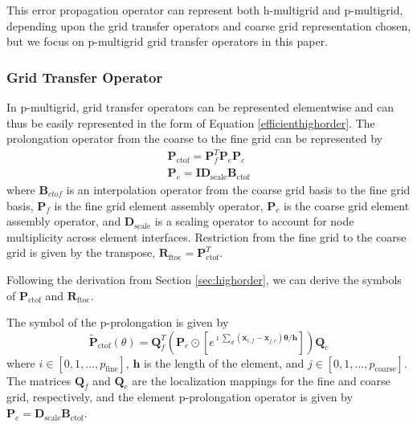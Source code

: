 \documentclass[review]{siamart190516}
\begin{document}
This error propagation operator can represent both h-multigrid and p-multigrid, depending upon the grid transfer operators and coarse grid representation chosen, but we focus on p-multigrid grid transfer operators in this paper.

\subsubsection{Grid Transfer Operator}\label{sec:grids}

In p-multigrid, grid transfer operators can be represented elementwise and can thus be easily represented in the form of Equation \ref{efficienthighorder}.
The prolongation operator from the coarse to the fine grid can be represented by
\begin{equation}
\begin{split}
\mathbf{P}_{\text{ctof}} = \mathbf{P}_f^T \mathbf{P}_e \mathbf{P}_c\\
\mathbf{P}_e = \mathbf{I} \mathbf{D}_{\text{scale}} \mathbf{B}_{\text{ctof}}
\end{split}
\end{equation}
where $\mathbf{B}_{ctof}$ is an interpolation operator from the coarse grid basis to the fine grid basis, $\mathbf{P}_f$ is the fine grid element assembly operator, $\mathbf{P}_c$ is the coarse grid element assembly operator, and $\mathbf{D}_{\text{scale}}$ is a scaling operator to account for node multiplicity across element interfaces.
Restriction from the fine grid to the coarse grid is given by the transpose, $\mathbf{R}_{\text{ftoc}} = \mathbf{P}_{\text{ctof}}^T$.

Following the derivation from Section \ref{sec:highorder}, we can derive the symbols of $\mathbf{P}_{\text{ctof}}$ and $\mathbf{R}_{\text{ftoc}}$.

\begin{definition}
The symbol of the p-prolongation is given by
\begin{equation}
\tilde{\mathbf{P}}_{\text{ctof}} \left( \theta \right) = \mathbf{Q}_f^T \left( \mathbf{P}_e \odot \left[ e^{\imath \sum_d \left( \mathbf{x}_{i, f} - \mathbf{x}_{j, c} \right) \mathbf{\theta} / \mathbf{h}} \right] \right) \mathbf{Q}_c
\end{equation}
where $i \in \left[ 0, 1, \dots, p_{\text{fine}} \right]$, $\mathbf{h}$ is the length of the element, and $j \in \left[ 0, 1, \dots, p_{\text{coarse}} \right]$.
The matrices $\mathbf{Q}_f$ and $\mathbf{Q}_c$ are the localization mappings for the fine and coarse grid, respectively, and the element p-prolongation operator is given by $\mathbf{P}_e = \mathbf{D}_{\text{scale}} \mathbf{B}_{\text{ctof}}$.
\end{definition}\label{def:prolongation_symbol}
\end{document}
